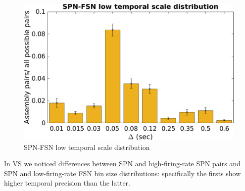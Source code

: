 \begin{figure}
    \centering
    \includegraphics[scale=0.5]{figures/SPN_FSNlow1.pdf}
    \caption{SPN-FSN low temporal scale distribution}
    \label{fig:SPN_FSNlowBin}
\end{figure}
In VS we noticed differences between SPN and high-firing-rate SPN pairs and SPN and low-firing-rate FSN bin size distributions: specifically the firsts show higher temporal precision than the latter.
